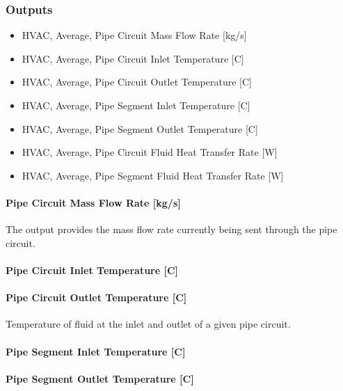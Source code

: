 \subsubsection{Outputs}\label{outputs-9-004}

\begin{itemize}
\item
  HVAC, Average, Pipe Circuit Mass Flow Rate {[}kg/s{]}
\item
  HVAC, Average, Pipe Circuit Inlet Temperature {[}C{]}
\item
  HVAC, Average, Pipe Circuit Outlet Temperature {[}C{]}
\item
  HVAC, Average, Pipe Segment Inlet Temperature {[}C{]}
\item
  HVAC, Average, Pipe Segment Outlet Temperature {[}C{]}
\item
  HVAC, Average, Pipe Circuit Fluid Heat Transfer Rate {[}W{]}
\item
  HVAC, Average, Pipe Segment Fluid Heat Transfer Rate {[}W{]}
\end{itemize}

\paragraph{Pipe Circuit Mass Flow Rate {[}kg/s{]}}\label{pipe-circuit-mass-flow-rate-kgs}

The output provides the mass flow rate currently being sent through the pipe circuit.

\paragraph{Pipe Circuit Inlet Temperature {[}C{]}}\label{pipe-circuit-inlet-temperature-c}

\paragraph{Pipe Circuit Outlet Temperature {[}C{]}}\label{pipe-circuit-outlet-temperature-c}

Temperature of fluid at the inlet and outlet of a given pipe circuit.

\paragraph{Pipe Segment Inlet Temperature {[}C{]}}\label{pipe-segment-inlet-temperature-c}

\paragraph{Pipe Segment Outlet Temperature {[}C{]}}\label{pipe-segment-outlet-temperature-c}

